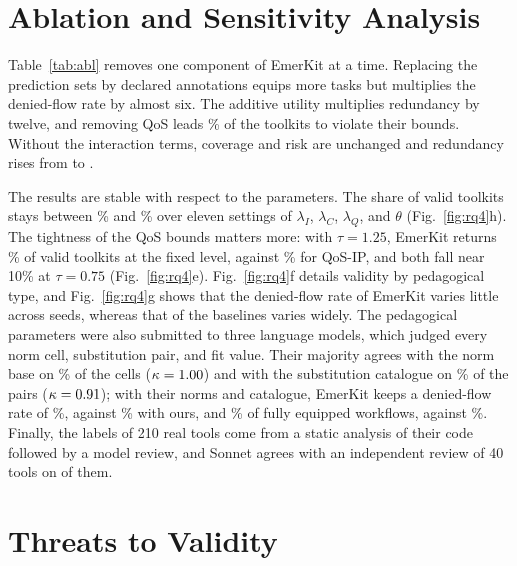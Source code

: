 \documentclass[10pt]{article}
\newcommand{\sysname}{EmerKit}
\begin{document}
\section{Ablation and Sensitivity Analysis}\label{sec:res-sens}

\begin{table}[!ht]\centering
\caption{Ablation of the components of \sysname{}: equipped, valid, denied-flow rate, QoS violations, and load (\%), and redundancy. Best value in bold.}\label{tab:abl}
\scriptsize\setlength{\tabcolsep}{3pt}
\end{table}

Table~\ref{tab:abl} removes one component of \sysname{} at a time. Replacing the prediction sets by declared annotations equips more tasks but multiplies the denied-flow rate by almost six. The additive utility multiplies redundancy by twelve, and removing QoS leads \RDNoQosQviol\% of the toolkits to violate their bounds. Without the interaction terms, coverage and risk are unchanged and redundancy rises from \RDFullEmerkitRed{} to \RDNoInteractionsRed.

The results are stable with respect to the parameters. The share of valid toolkits stays between \RDtwoValidMin\% and \RDtwoValidMax\% over eleven settings of $\lambda_I$, $\lambda_C$, $\lambda_Q$, and $\theta$ (Fig.~\ref{fig:rq4}h). The tightness of the QoS bounds matters more: with $\tau=1.25$, \sysname{} returns \RAfourEmk\% of valid toolkits at the fixed level, against \RAfourZeng\% for QoS-IP, and both fall near 10\% at $\tau=0.75$ (Fig.~\ref{fig:rq4}e). Fig.~\ref{fig:rq4}f details validity by pedagogical type, and Fig.~\ref{fig:rq4}g shows that the denied-flow rate of \sysname{} varies little across seeds, whereas that of the baselines varies widely. The pedagogical parameters were also submitted to three language models, which judged every norm cell, substitution pair, and fit value. Their majority agrees with the norm base on \RJnAgree\% of the cells ($\kappa=1.00$) and with the substitution catalogue on \RJsAgree\% of the pairs ($\kappa=0.91$); with their norms and catalogue, \sysname{} keeps a denied-flow rate of \RPonePanelDfr\%, against \RPoneStandardDfr\% with ours, and \RPtwoPanelAll\% of fully equipped workflows, against \RPtwoStandardAll\%. Finally, the labels of 210 real tools come from a static analysis of their code followed by a model review, and Sonnet agrees with an independent review of 40 tools on \RAuSonnetAgree{} of them.

\section{Threats to Validity}\label{sec:threats}
\end{document}
